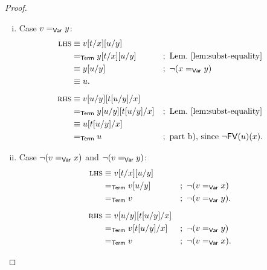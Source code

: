 \begin{proof}
\begin{enumerate}[a),font=\upshape]
\begin{itemize}
\begin{enumerate}[i)]
                \item Case $v\mathrel{=_{\mathsf{Var}}}y$:
                \begin{align*}
                    \lhs&\equiv v[t/x][u/y]\\
                        &\eq{\fun{Term}}y[t/x][u/y]
                            &&;\ \text{Lem.~\ref{lem:subst-equality}}\\
                        &\equiv y[u/y]
                            &&;\ \neg(x\eq{\fun{Var}}y)\\
                        &\equiv u.\\[2mm]
                    \rhs&\equiv v[u/y][t[u/y]/x]\\
                        &\eq{\fun{Term}}y[u/y][t[u/y]/x]
                            &&;\ \text{Lem.~\ref{lem:subst-equality}}\\
                        &\equiv u[t[u/y]/x]\\
                        &\eq{\fun{Term}} u
                            &&;\ \text{part b), since } \neg\fun{FV}(u)(x).
                \end{align*}
                
                \item Case $\neg(v\mathrel{=_{\mathsf{Var}}}x)$ and $\neg(v\mathrel{=_{\mathsf{Var}}}y)$: 
                \begin{align*}
                    \textsc{lhs}&\equiv v[t/x][u/y]\\
                        &\mathrel{=_{\mathsf{Term}}} v[u/y]
                            &&;\ \neg(v\mathrel{=_{\mathsf{Var}}}x)\\
                        &\mathrel{=_{\mathsf{Term}}} v
                            &&;\ \neg(v\mathrel{=_{\mathsf{Var}}}y).\\[2mm]
                    \textsc{rhs}&\equiv v[u/y][t[u/y]/x]\\
                        &\mathrel{=_{\mathsf{Term}}} v[t[u/y]/x]
                            &&;\ \neg(v\mathrel{=_{\mathsf{Var}}}y)\\
                        &\mathrel{=_{\mathsf{Term}}} v
                            &&;\ \neg(v\mathrel{=_{\mathsf{Var}}}x).
                \end{align*}
            \end{enumerate}
            

\end{itemize}
\end{enumerate}
\end{proof}
